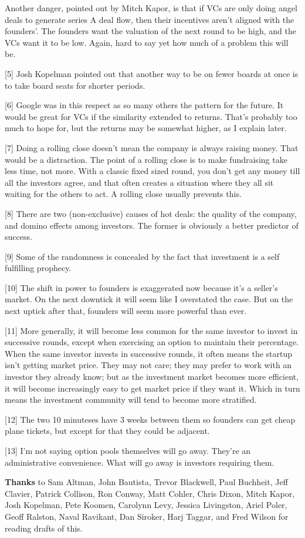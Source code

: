 Another danger, pointed out by Mitch Kapor, is that if VCs are only
doing angel deals to generate series A deal flow, then their
incentives aren't aligned with the founders'.  The founders want
the valuation of the next round to be high, and the VCs want it to
be low.  Again, hard to say yet how much of a problem this will be.

[5]
Josh Kopelman pointed out that another way to be on fewer
boards at once is to take board seats for shorter periods.

[6]
Google was in this respect as so many others the pattern for
the future.  It would be great for VCs if the similarity extended
to returns.  That's probably too much to hope for, but the returns
may be somewhat higher, as I explain later.

[7]
Doing a rolling close doesn't mean the company is always
raising money.  That would be a distraction.  The point of a rolling
close is to make fundraising take less time, not more.  With a
classic fixed sized round, you don't get any money till all the
investors agree, and that often creates a situation where they all
sit waiting for the others to act.  A rolling close usually prevents
this.


[8]
There are two (non-exclusive) causes of hot deals: the quality
of the company, and domino effects among investors.  The former is
obviously a better predictor of success.

[9]
Some of the randomness is concealed by the fact that investment
is a self fulfilling prophecy.

[10]
The shift in power to founders is exaggerated now because
it's a seller's market.  On the next downtick it will seem like I
overstated the case.  But on the next uptick after that, founders
will seem more powerful than ever.

[11]
More generally, it will become less common for the same
investor to invest in successive rounds, except when exercising an
option to maintain their percentage.  When the same investor invests
in successive rounds, it often means the startup isn't getting
market price.  They may not care; they may prefer to work with an
investor they already know; but as the investment market becomes
more efficient, it will become increasingly easy to get market price
if they want it.  Which in turn means the investment community will
tend to become more stratified.

[12]
The two 10 minuteses have 3 weeks between them so founders
can get cheap plane tickets, but except for that they could be
adjacent.

[13]
I'm not saying option pools themselves will go away.  They're
an administrative convenience.  What will go away is investors
requiring them.




\textbf{Thanks} to Sam Altman, John Bautista, Trevor Blackwell,
Paul Buchheit, Jeff Clavier,
Patrick Collison, Ron Conway, Matt Cohler, Chris Dixon, Mitch Kapor,
Josh Kopelman, Pete Koomen, Carolynn Levy, Jessica Livingston, Ariel
Poler, Geoff Ralston, Naval Ravikant, Dan Siroker, Harj Taggar, and 
Fred Wilson
for reading drafts of this.




